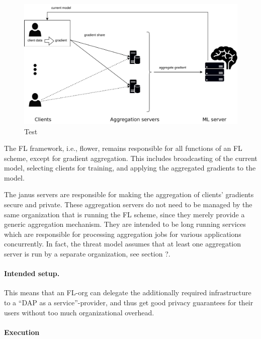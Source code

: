 \documentclass{article}
\begin{document}
\begin{figure}[h]
  \centering
  \includegraphics[width=\columnwidth]{assets/dpsa-overview-2-edit_no_explanations-2023-08-22.drawio.pdf}
  \caption{Test}
  \label{fig:architecture}
\end{figure}

The FL framework, i.e., flower, remains responsible for all functions of an FL
scheme, except for gradient aggregation. This includes broadcasting of the
current model, selecting clients for training, and applying the aggregated
gradients to the model.

The janus servers are responsible for making the aggregation of clients'
gradients secure and private. These aggregation servers do not need to be
managed by the same organization that is running the FL scheme, since they
merely provide a generic aggregation mechanism. They are intended to be long
running services which are responsible for processing aggregation jobs for
various applications concurrently. In fact, the threat model assumes that at
least one aggregation server is run by a separate organization, see section ?.

\paragraph{Intended setup.}

This means that an FL-org can delegate the additionally required infrastructure
to a ``DAP as a service''-provider, and thus get good privacy guarantees for
their users without too much organizational overhead.

\paragraph{Execution}
\end{document}
